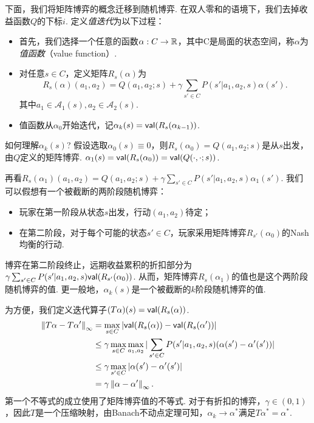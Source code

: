 下面，我们将矩阵博弈的概念迁移到随机博弈. 在双人零和的语境下，我们去掉收益函数$Q$的下标$i$. 定义\emph{值迭代}为以下过程：
\begin{itemize}
    \item 首先，我们选择一个任意的函数$\alpha: C\to \mathbb{R}$，其中C是局面的状态空间，称$\alpha$为\emph{值函数}（value function）.
    \item 对任意$s\in C$，定义矩阵$R_s(\alpha)$为
    \[R_s(\alpha)(a_1,a_2) = Q(a_1,a_2;s) + \gamma \sum_{s'\in C}P(s'|a_1,a_2,s)\alpha(s').\]
    其中$a_1\in \mathcal A_1(s), a_2\in \mathcal A_2(s)$.
    \item 值函数从$\alpha_0$开始迭代，记$\alpha_k(s)=\mathsf{val}(R_s(\alpha_{k-1}))$. 
\end{itemize}
如何理解$\alpha_k(s)$? 假设选取$\alpha_0(s)\equiv 0$，则$R_s(\alpha_0)=Q(a_1,a_2;s)$是从$s$出发，由$Q$定义的矩阵博弈. $\alpha_1(s)=\mathsf{val}(R_s(\alpha_0))=\mathsf{val}(Q(\cdot,\cdot;s))$.

再看$R_s(\alpha_1)(a_1,a_2)=Q(a_1,a_2;s)+\gamma\sum_{s'\in C}P(s'|a_1,a_2,s)\alpha_1(s')$. 我们可以假想有一个被截断的两阶段随机博弈：
        \begin{itemize}
            \item 玩家在第一阶段从状态$s$出发，行动$(a_1,a_2)$待定；\item 在第二阶段，对于每个可能的状态$s'\in C$，玩家采用矩阵博弈$R_{s'}(\alpha_0)$的Nash均衡的行动.
        \end{itemize} 
博弈在第二阶段终止，远期收益累积的折扣部分为$\gamma \sum_{s'\in C}P(s'|a_1,a_2,s)\mathsf{val}(R_{s'}(\alpha_0))$. 从而，矩阵博弈$R_s(\alpha_1)$的值也是这个两阶段随机博弈的值. 更一般地，$\alpha_{k}(s)$是一个被截断的$k$阶段随机博弈的值.

为方便，我们定义迭代算子$(T\alpha)(s) = \mathsf{val}(R_s(\alpha))$.
        \begin{align*}
            \left\|T\alpha-T\alpha'\right\|_\infty &= \max_{s\in C}|\mathsf{val} (R_s(\alpha)) - \mathsf{val}(R_s(\alpha'))| \\
            &\le \gamma \max_{s\in C} \max_{a_1,a_2}|\sum_{s'\in C}P(s'|a_1,a_2,s)(\alpha(s') - \alpha'(s'))| \\
            &\le \gamma \max_{s'\in C} |\alpha(s') - \alpha'(s')| \\
            &= \gamma \left\|\alpha-\alpha'\right\|_\infty.
        \end{align*}
第一个不等式的成立使用了矩阵博弈值的不等式. 对于有折扣的博弈，$\gamma\in (0,1)$，因此$T$是一个压缩映射，由Banach不动点定理可知，$\alpha_k\to \alpha^*$满足$T\alpha^*=\alpha^*$.

